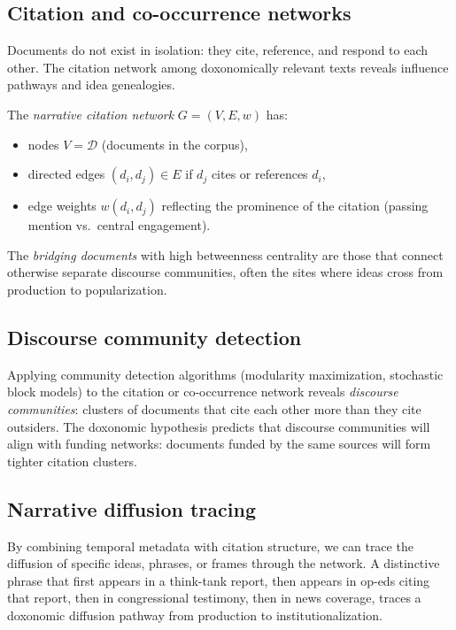 \subsection{Citation and co-occurrence networks}

Documents do not exist in isolation: they cite, reference, and respond to each other.
The citation network among doxonomically relevant texts reveals influence pathways and idea genealogies.

\begin{definition}
\label{def:cite-network}
The \emph{narrative citation network} $G = (V, E, w)$ has:
\begin{itemize}[nosep]
  \item nodes $V = \mathcal{D}$ (documents in the corpus),
  \item directed edges $(d_i, d_j) \in E$ if $d_j$ cites or references $d_i$,
  \item edge weights $w(d_i, d_j)$ reflecting the prominence of the citation (passing mention vs.\ central engagement).
\end{itemize}
The \emph{bridging documents} with high betweenness centrality are those that connect otherwise separate discourse communities, often the sites where ideas cross from production to popularization.
\end{definition}

\subsection{Discourse community detection}

Applying community detection algorithms (modularity maximization, stochastic block models) to the citation or co-occurrence network reveals \emph{discourse communities}: clusters of documents that cite each other more than they cite outsiders.
The doxonomic hypothesis predicts that discourse communities will align with funding networks: documents funded by the same sources will form tighter citation clusters.

\subsection{Narrative diffusion tracing}

By combining temporal metadata with citation structure, we can trace the diffusion of specific ideas, phrases, or frames through the network.
A distinctive phrase that first appears in a think-tank report, then appears in op-eds citing that report, then in congressional testimony, then in news coverage, traces a doxonomic diffusion pathway from production to institutionalization.

